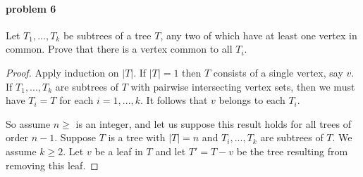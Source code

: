\paragraph{problem 6}
Let $ T_1,...,T_k $ be subtrees of a tree $ T $, any two of which have at least 
one vertex in common. Prove that there is a vertex common to all $ T_i$.
\begin{proof}
   Apply induction on $|T|$. If $|T| = 1$ then $T$ consists of a single vertex,
   say $ v$. If $ T_1,...,T_k $ are subtrees of $ T $ with pairwise intersecting
   vertex sets, then we must have $T_i = T$ for each $ i = 1,...,k$. It follows 
   that $ v $ belongs to each $ T_i$.
   
   \smallskip \noindent
   So assume $ n \geq $ is an integer, and let us suppose this result holds for 
   all trees of order $ n - 1 $. Suppose $ T $ is a tree with $ |T| = n $ and 
   $ T_i,...,T_k $ are subtrees of $ T $. We assume $ k \geq 2 $. Let $ v $ be a 
   leaf in $ T $ and let $ T' = T - v $ be the tree resulting from removing
   this leaf. 
\end{proof}

